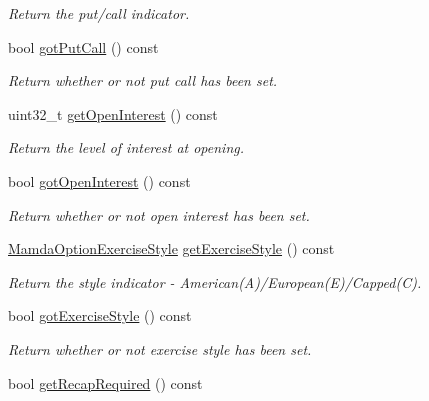 \begin{CompactItemize}
\begin{CompactList}\small\item\em Return the put/call indicator. \item\end{CompactList}\item 
bool \hyperlink{classWombat_1_1MamdaOptionContract_b4dc254911cac44a174f4a010dba3507}{got\-Put\-Call} () const 
\begin{CompactList}\small\item\em Return whether or not put call has been set. \item\end{CompactList}\item 
uint32\_\-t \hyperlink{classWombat_1_1MamdaOptionContract_e859d329f94a7eab79a34f1db4fe5731}{get\-Open\-Interest} () const 
\begin{CompactList}\small\item\em Return the level of interest at opening. \item\end{CompactList}\item 
bool \hyperlink{classWombat_1_1MamdaOptionContract_15dd69320c1c03982c44b339e806d0ad}{got\-Open\-Interest} () const 
\begin{CompactList}\small\item\em Return whether or not open interest has been set. \item\end{CompactList}\item 
\hyperlink{namespaceWombat_e7be5722df9d72164d322f2b72cf8d1a}{Mamda\-Option\-Exercise\-Style} \hyperlink{classWombat_1_1MamdaOptionContract_5273af6a0f17a001ce2ea6e80621ae39}{get\-Exercise\-Style} () const 
\begin{CompactList}\small\item\em Return the style indicator - American(A)/European(E)/Capped(C). \item\end{CompactList}\item 
bool \hyperlink{classWombat_1_1MamdaOptionContract_1748619372a2553ccb58cc2f6bc1afd4}{got\-Exercise\-Style} () const 
\begin{CompactList}\small\item\em Return whether or not exercise style has been set. \item\end{CompactList}\item 
bool \hyperlink{classWombat_1_1MamdaOptionContract_9f56471e4fca1f924e2401ddaf257f3c}{get\-Recap\-Required} () const 

\end{CompactItemize}
